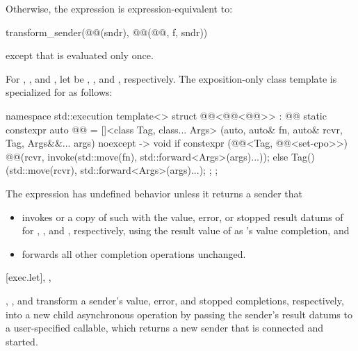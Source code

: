 \pnum
Otherwise,
the expression  is expression-equivalent to:
\begin{codeblock}
transform_sender(@@(sndr), @@(@@, f, sndr))
\end{codeblock}
except that  is evaluated only once.

\pnum
For , , and ,
let  be
, , and , respectively.
The exposition-only class template 
is specialized for  as follows:
\begin{codeblock}
namespace std::execution {
  template<>
  struct @@<@@<@@>> : @@ {
    static constexpr auto @@ =
      []<class Tag, class... Args>
        (auto, auto& fn, auto& rcvr, Tag, Args&&... args) noexcept -> void {
          if constexpr (@@<Tag, @@<set-cpo>>) {
            @@(rcvr,
                          invoke(std::move(fn), std::forward<Args>(args)...));
          } else {
            Tag()(std::move(rcvr), std::forward<Args>(args)...);
          }
        };
  };
}
\end{codeblock}

\pnum
The expression  has undefined behavior
unless it returns a sender that
\begin{itemize}
\item
invokes  or a copy of such
with the value, error, or stopped result datums of 
for , , and , respectively,
using the result value of  as 's value completion, and
\item
forwards all other completion operations unchanged.
\end{itemize}

[exec.let]{, , }

\pnum
{}, , and  transform
a sender's value, error, and stopped completions, respectively,
into a new child asynchronous operation
by passing the sender's result datums to a user-specified callable,
which returns a new sender that is connected and started.

